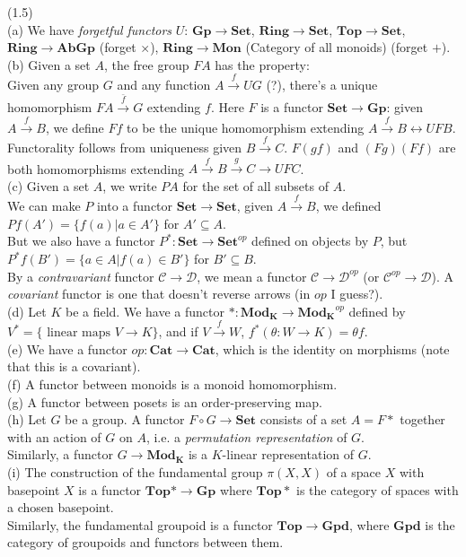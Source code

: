 \documentclass[a4paper]{article}
\begin{document}
\begin{eg} (1.5)\\
    (a) We have \emph{forgetful functors} $U$: $\mathbf{Gp} \to \mathbf{Set}$, $\mathbf{Ring}\to \mathbf{Set}$, $\mathbf{Top} \to \mathbf{Set}$, $\mathbf{Ring} \to \mathbf{AbGp}$ (forget $\times$), $\mathbf{Ring} \to \mathbf{Mon}$ (Category of all monoids) (forget $+$).\\
    (b) Given a set $A$, the free group $FA$ has the property:\\
    Given any group $G$ and any function $A \xrightarrow{f} UG$ (?), there's a unique homomorphism $FA \xrightarrow{\bar{f}} G$ extending $f$. Here $F$ is a functor $\mathbf{Set}\to \mathbf{Gp}$: given $A \xrightarrow{f} B$, we define $Ff$ to be the unique homomorphism extending $A \xrightarrow{f} B \leftrightarrow UFB$. Functorality follows from uniqueness given $B \xrightarrow{f} C$. $F(gf)$ and $(Fg)(Ff)$ are both homomorphisms extending $A \xrightarrow{f} B \xrightarrow{g} C \rightarrow UFC$.\\
    (c) Given a set $A$, we write $PA$ for the set of all subsets of $A$.\\
    We can make $P$ into a functor $\mathbf{Set} \to \mathbf{Set}$, given $A \xrightarrow{f} B$, we defined $Pf(A') = \{f(a) | a \in A'\}$ for $A' \subseteq A$.\\
    But we also have a functor $P^* : \mathbf{Set} \to \mathbf{Set}^{op}$ defined on objects by $P$, but $P^* f(B') = \{a \in A | f(a) \in B'\}$ for $B' \subseteq B$.\\
    By a \emph{contravariant} functor $\mathcal{C} \to \mathcal{D}$, we mean a functor $\mathcal{C} \to \mathcal{D}^{op}$ (or $\mathcal{C}^{op} \to \mathcal{D}$). A \emph{covariant} functor is one that doesn't reverse arrows (in $op$ I guess?).\\
    (d) Let $K$ be a field. We have a functor $*:\mathbf{Mod_K} \to \mathbf{Mod_K}^{op}$ defined by $V^* = \{ \text{ linear maps }  V \to K\}$, and if $V \xrightarrow{f} W$, $f^*(\theta:W \to K) = \theta f$.\\
    (e) We have a functor $op: \mathbf{Cat} \to \mathbf{Cat}$, which is the identity on morphisms (note that this is a covariant).\\
    (f) A functor between monoids is a monoid homomorphism.\\
    (g) A functor between posets is an order-preserving map.\\
    (h) Let $G$ be a group. A functor $F \circ G \to \mathbf{Set}$ consists of a set $A=F*$ together with an action of $G$ on $A$, i.e. a \emph{permutation representation} of $G$.\\
    Similarly, a functor $G \to \mathbf{Mod_K}$ is a $K$-linear representation of $G$.\\
    (i) The construction of the fundamental group $\pi(X,X)$ of a space $X$ with basepoint $X$ is a functor $\mathbf{Top}* \to \mathbf{Gp}$ where $\mathbf{Top}*$ is the category of spaces with a chosen basepoint.\\
    Similarly, the fundamental groupoid is a functor $\mathbf{Top} \to \mathbf{Gpd}$, where $\mathbf{Gpd}$ is the category of groupoids and functors between them.
\end{eg}
\end{document}
